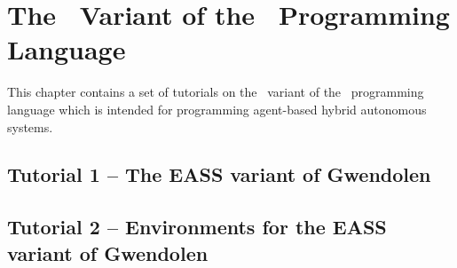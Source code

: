 %
\chapter{The \eass\ Variant of the \gwendolen\ Programming Language}
\label{chap:eass}

This chapter contains a set of tutorials on the \eass\ variant of the \gwendolen\ programming language which is intended for programming agent-based hybrid autonomous systems.

\section{Tutorial 1 -- The EASS variant of Gwendolen}

{
  \let\section\subsection
  \let\subsection\subsubsection
  \let\subsubsection\paragraph
  
  
  }

\section{Tutorial 2 -- Environments for the EASS variant of Gwendolen}

